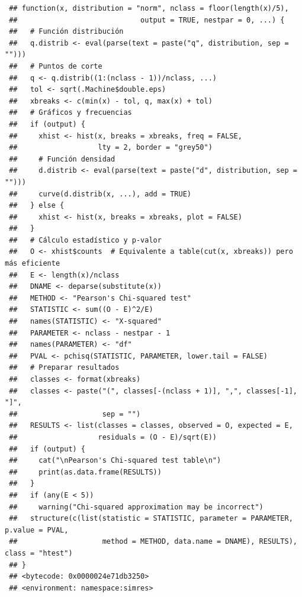 \documentclass[
  10pt,
]{book}
\theoremstyle{break}
\theoremstyle{nonumberplain}
\begin{document}
\begin{verbatim}
 ## function(x, distribution = "norm", nclass = floor(length(x)/5),
 ##                             output = TRUE, nestpar = 0, ...) {
 ##   # Función distribución
 ##   q.distrib <- eval(parse(text = paste("q", distribution, sep = "")))
 ##   # Puntos de corte
 ##   q <- q.distrib((1:(nclass - 1))/nclass, ...)
 ##   tol <- sqrt(.Machine$double.eps)
 ##   xbreaks <- c(min(x) - tol, q, max(x) + tol)
 ##   # Gráficos y frecuencias
 ##   if (output) {
 ##     xhist <- hist(x, breaks = xbreaks, freq = FALSE,
 ##                   lty = 2, border = "grey50")
 ##     # Función densidad
 ##     d.distrib <- eval(parse(text = paste("d", distribution, sep = "")))
 ##     curve(d.distrib(x, ...), add = TRUE)
 ##   } else {
 ##     xhist <- hist(x, breaks = xbreaks, plot = FALSE)
 ##   }
 ##   # Cálculo estadístico y p-valor
 ##   O <- xhist$counts  # Equivalente a table(cut(x, xbreaks)) pero más eficiente
 ##   E <- length(x)/nclass
 ##   DNAME <- deparse(substitute(x))
 ##   METHOD <- "Pearson's Chi-squared test"
 ##   STATISTIC <- sum((O - E)^2/E)
 ##   names(STATISTIC) <- "X-squared"
 ##   PARAMETER <- nclass - nestpar - 1
 ##   names(PARAMETER) <- "df"
 ##   PVAL <- pchisq(STATISTIC, PARAMETER, lower.tail = FALSE)
 ##   # Preparar resultados
 ##   classes <- format(xbreaks)
 ##   classes <- paste("(", classes[-(nclass + 1)], ",", classes[-1], "]",
 ##                    sep = "")
 ##   RESULTS <- list(classes = classes, observed = O, expected = E,
 ##                   residuals = (O - E)/sqrt(E))
 ##   if (output) {
 ##     cat("\nPearson's Chi-squared test table\n")
 ##     print(as.data.frame(RESULTS))
 ##   }
 ##   if (any(E < 5))
 ##     warning("Chi-squared approximation may be incorrect")
 ##   structure(c(list(statistic = STATISTIC, parameter = PARAMETER, p.value = PVAL,
 ##                    method = METHOD, data.name = DNAME), RESULTS), class = "htest")
 ## }
 ## <bytecode: 0x0000024e71db3250>
 ## <environment: namespace:simres>
\end{verbatim}
\end{document}

